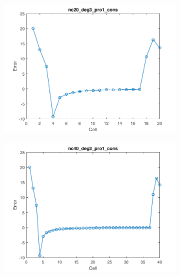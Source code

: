 \documentclass[11pt,a4paper]{article}
\theoremstyle{plain}
\theoremstyle{definition}
\begin{document}
\begin{figure}[H]
\begin{subfigure}[b]{0.48\textwidth}
\includegraphics[width=\linewidth]{../../tests_01_01/test_01_01_test48_pro1_cons/output/plots/nc20_deg3_wei111_pro1_cons.pdf}
\end{subfigure}\hspace*{\fill}
\begin{subfigure}[b]{0.48\textwidth}
\includegraphics[width=\linewidth]{../../tests_01_01/test_01_01_test48_pro1_cons/output/plots/nc40_deg3_wei111_pro1_cons.pdf}
\end{subfigure}


\end{figure}
\end{document}
